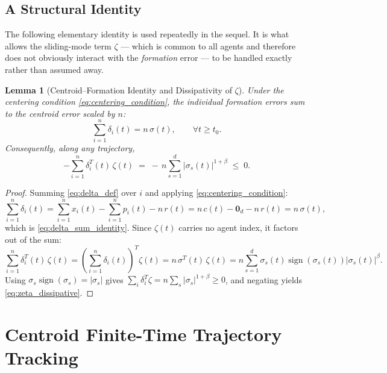 \documentclass[11pt]{article}
\newtheorem{lemma}{Lemma}
\begin{document}
\subsection{A Structural Identity}

The following elementary identity is used repeatedly in the sequel. It is what allows the sliding-mode term $\zeta$ --- which is common to all agents and therefore does not obviously interact with the \emph{formation} error --- to be handled exactly rather than assumed away.

\begin{lemma}[Centroid--Formation Identity and Dissipativity of $\zeta$]
Under the centering condition \eqref{eq:centering_condition}, the individual formation errors sum to the centroid error scaled by $n$:
\begin{equation}
\sum_{i=1}^{n} \delta_i(t) = n\,\sigma(t), \qquad \forall t \ge t_0.
\label{eq:delta_sum_identity}
\end{equation}
Consequently, along any trajectory,
\begin{equation}
-\sum_{i=1}^{n} \delta_i^T(t)\,\zeta(t) \;=\; -\,n\sum_{s=1}^{d} |\sigma_s(t)|^{1+\beta} \;\le\; 0 .
\label{eq:zeta_dissipative}
\end{equation}
\end{lemma}

\begin{proof}
Summing \eqref{eq:delta_def} over $i$ and applying \eqref{eq:centering_condition}:
\begin{equation}
\sum_{i=1}^{n}\delta_i(t) = \sum_{i=1}^{n} x_i(t) - \sum_{i=1}^{n} p_i(t) - n\,r(t) = n\,c(t) - \mathbf{0}_d - n\,r(t) = n\,\sigma(t),
\end{equation}
which is \eqref{eq:delta_sum_identity}. Since $\zeta(t)$ carries no agent index, it factors out of the sum:
\begin{equation}
\sum_{i=1}^{n}\delta_i^T(t)\,\zeta(t) = \left(\sum_{i=1}^{n}\delta_i(t)\right)^{\!T}\!\zeta(t) = n\,\sigma^T(t)\,\zeta(t) = n\sum_{s=1}^{d}\sigma_s(t)\operatorname{sign}(\sigma_s(t))|\sigma_s(t)|^\beta .
\end{equation}
Using $\sigma_s \operatorname{sign}(\sigma_s) = |\sigma_s|$ gives $\sum_{i}\delta_i^T \zeta = n\sum_{s}|\sigma_s|^{1+\beta} \ge 0$, and negating yields \eqref{eq:zeta_dissipative}.
\end{proof}

\section{Centroid Finite-Time Trajectory Tracking}
\end{document}
